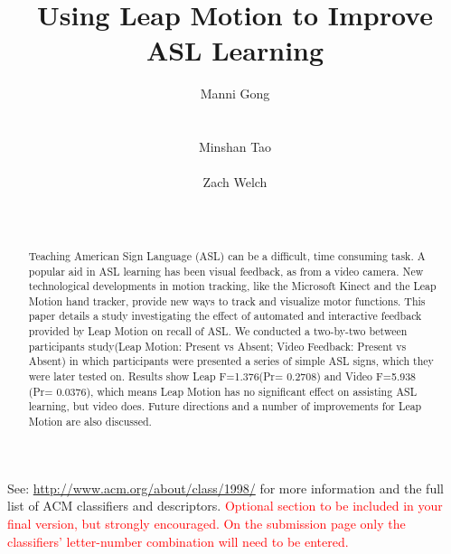 \documentclass{sigchi}
\begin{document}
\title{Using Leap Motion to Improve ASL Learning}

\author{
  \alignauthor Manni Gong\\
    \\
    \\
  \alignauthor Minshan Tao\\
    \\
  \alignauthor Zach Welch\\
    \\
    \\
}

\maketitle

\begin{abstract}
Teaching American Sign Language (ASL) can be a difficult, time consuming task. A popular aid in ASL learning has been visual feedback, as from a video camera. New technological developments in motion tracking, like the Microsoft Kinect and the Leap Motion hand tracker, provide new ways to track and visualize motor functions. This paper details a study investigating the effect of automated and interactive feedback provided by Leap Motion on recall of ASL. We conducted a two-by-two between participants  study(Leap Motion: Present vs Absent; Video Feedback: Present vs Absent) in which participants were presented a series of simple ASL signs, which they were later tested on. Results show Leap F=1.376(Pr= 0.2708) and Video F=5.938 (Pr= 0.0376), which means Leap Motion has no significant effect on assisting ASL learning, but video does. Future directions and a number of improvements for Leap Motion are also discussed. 
\end{abstract}



See: \url{http://www.acm.org/about/class/1998/}
for more information and the full list of ACM classifiers
and descriptors. \newline
\textcolor{red}{Optional section to be included in your final version, 
but strongly encouraged. On the submission page only the classifiers’ 
letter-number combination will need to be entered.}
\end{document}
